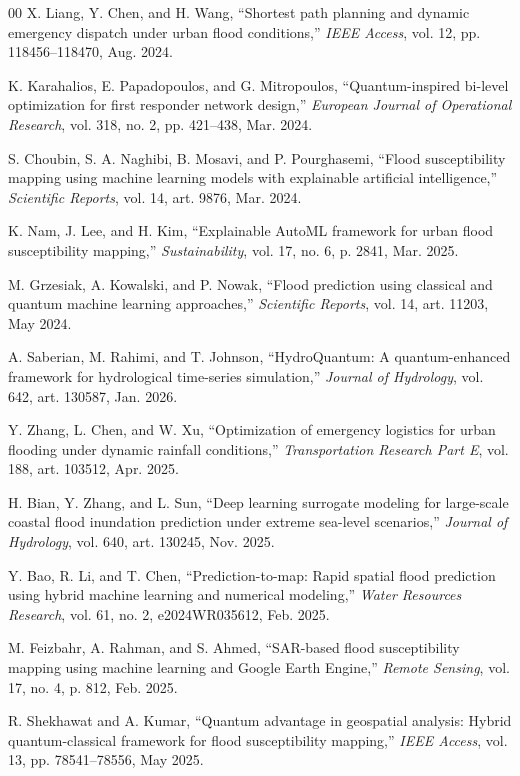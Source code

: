 \documentclass[conference]{IEEEtran}
\begin{document}
\begin{thebibliography}{00}
 X. Liang, Y. Chen, and H. Wang, ``Shortest path planning and dynamic emergency dispatch under urban flood conditions,'' \emph{IEEE Access}, vol. 12, pp. 118456--118470, Aug. 2024.

 K. Karahalios, E. Papadopoulos, and G. Mitropoulos, ``Quantum-inspired bi-level optimization for first responder network design,'' \emph{European Journal of Operational Research}, vol. 318, no. 2, pp. 421--438, Mar. 2024.

 S. Choubin, S. A. Naghibi, B. Mosavi, and P. Pourghasemi, ``Flood susceptibility mapping using machine learning models with explainable artificial intelligence,'' \emph{Scientific Reports}, vol. 14, art. 9876, Mar. 2024.

 K. Nam, J. Lee, and H. Kim, ``Explainable AutoML framework for urban flood susceptibility mapping,'' \emph{Sustainability}, vol. 17, no. 6, p. 2841, Mar. 2025.

 M. Grzesiak, A. Kowalski, and P. Nowak, ``Flood prediction using classical and quantum machine learning approaches,'' \emph{Scientific Reports}, vol. 14, art. 11203, May 2024.

 A. Saberian, M. Rahimi, and T. Johnson, ``HydroQuantum: A quantum-enhanced framework for hydrological time-series simulation,'' \emph{Journal of Hydrology}, vol. 642, art. 130587, Jan. 2026.

 Y. Zhang, L. Chen, and W. Xu, ``Optimization of emergency logistics for urban flooding under dynamic rainfall conditions,'' \emph{Transportation Research Part E}, vol. 188, art. 103512, Apr. 2025.

 H. Bian, Y. Zhang, and L. Sun, ``Deep learning surrogate modeling for large-scale coastal flood inundation prediction under extreme sea-level scenarios,'' \emph{Journal of Hydrology}, vol. 640, art. 130245, Nov. 2025.

 Y. Bao, R. Li, and T. Chen, ``Prediction-to-map: Rapid spatial flood prediction using hybrid machine learning and numerical modeling,'' \emph{Water Resources Research}, vol. 61, no. 2, e2024WR035612, Feb. 2025.

 M. Feizbahr, A. Rahman, and S. Ahmed, ``SAR-based flood susceptibility mapping using machine learning and Google Earth Engine,'' \emph{Remote Sensing}, vol. 17, no. 4, p. 812, Feb. 2025.

 R. Shekhawat and A. Kumar, ``Quantum advantage in geospatial analysis: Hybrid quantum-classical framework for flood susceptibility mapping,'' \emph{IEEE Access}, vol. 13, pp. 78541--78556, May 2025.


\end{thebibliography}
\end{document}
